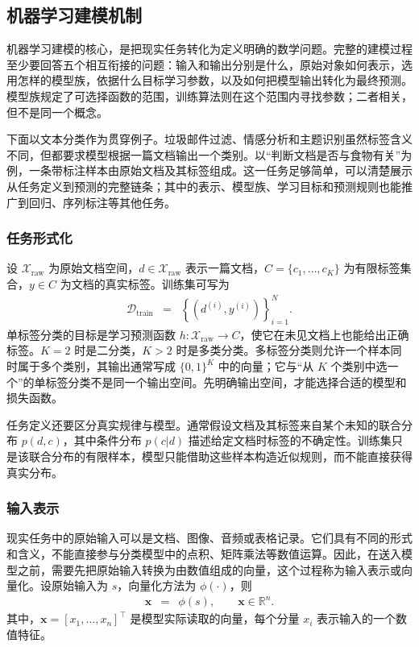 \subsection{机器学习建模机制}

机器学习建模的核心，是把现实任务转化为定义明确的数学问题。完整的建模过程至少要回答五个相互衔接的问题：输入和输出分别是什么，原始对象如何表示，选用怎样的模型族，依据什么目标学习参数，以及如何把模型输出转化为最终预测。模型族规定了可选择函数的范围，训练算法则在这个范围内寻找参数；二者相关，但不是同一个概念。

下面以文本分类作为贯穿例子。垃圾邮件过滤、情感分析和主题识别虽然标签含义不同，但都要求模型根据一篇文档输出一个类别。以“判断文档是否与食物有关”为例，一条带标注样本由原始文档及其标签组成。这一任务足够简单，可以清楚展示从任务定义到预测的完整链条；其中的表示、模型族、学习目标和预测规则也能推广到回归、序列标注等其他任务。

\subsubsection{任务形式化}

设 $\mathcal{X}_{\mathrm{raw}}$ 为原始文档空间，$d\in\mathcal{X}_{\mathrm{raw}}$ 表示一篇文档，$C=\{c_1,\ldots,c_K\}$ 为有限标签集合，$y\in C$ 为文档的真实标签。训练集可写为
\begin{eqnarray}
\mathcal{D}_{\mathrm{train}}
& = &
\left\{\left(d^{(i)},y^{(i)}\right)\right\}_{i=1}^{N}.
\end{eqnarray}
单标签分类的目标是学习预测函数 $h:\mathcal{X}_{\mathrm{raw}}\rightarrow C$，使它在未见文档上也能给出正确标签。$K=2$ 时是二分类，$K>2$ 时是多类分类。多标签分类则允许一个样本同时属于多个类别，其输出通常写成 $\{0,1\}^{K}$ 中的向量；它与“从 $K$ 个类别中选一个”的单标签分类不是同一个输出空间。先明确输出空间，才能选择合适的模型和损失函数。

任务定义还要区分真实规律与模型。通常假设文档及其标签来自某个未知的联合分布 $p(d,c)$，其中条件分布 $p(c|d)$ 描述给定文档时标签的不确定性。训练集只是该联合分布的有限样本，模型只能借助这些样本构造近似规则，而不能直接获得真实分布。

\subsubsection{输入表示}

现实任务中的原始输入可以是文档、图像、音频或表格记录。它们具有不同的形式和含义，不能直接参与分类模型中的点积、矩阵乘法等数值运算。因此，在送入模型之前，需要先把原始输入转换为由数值组成的向量，这个过程称为输入表示或向量化。设原始输入为 $s$，向量化方法为 $\phi(\cdot)$，则
\begin{eqnarray}
\mathbf{x} & = & \phi(s),
\qquad \mathbf{x}\in\mathbb{R}^{n}.
\end{eqnarray}
其中，$\mathbf{x}=[x_1,\ldots,x_n]^{\top}$ 是模型实际读取的向量，每个分量 $x_i$ 表示输入的一个数值特征。

